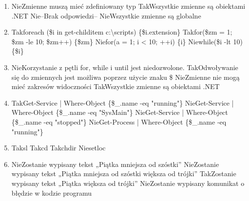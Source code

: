 \begin{enumerate}
		\newpage
		\item {}%
		{Nie}{Zmienne muszą mieć zdefiniowany typ}%
		{Tak}{Wszystkie zmienne są obiektami .NET}%
		{Nie}{--Brak odpowiedzi--}%
		{Nie}{Wszystkie zmienne są globalne}
		\item {}%
		{Tak}{foreach (\$i in get-childitem c:\textbackslash scripts) \{\$i.extension\}}%
		{Tak}{for(\$zm = 1; \$zm -le 10; \$zm++) \{\$zm\}}%
		{Nie}{for(a = 1; i < 10; ++i) \{i\}}%
		{Nie}{while(\$i -lt 10) \{\$i\}}
		\item {}%
		{Nie}{Korzystanie z pętli for, while i until jest niedozwolone.}%
		{Tak}{Odwoływanie się do zmiennych jest możliwa poprzez użycie znaku \$}%
		{Nie}{Zmienne nie mogą mieć zakresów widoczności}%
		{Tak}{Wszystkie zmienne są obiektami .NET}
		\item {}%
		{Tak}{Get-Service | Where-Object \{\$\_.name -eq "running"\}}%
		{Nie}{Get-Service | Where-Object \{\$\_.name -eq "SysMain"\}}%
		{Nie}{Get-Service | Where-Object \{\$\_.name -eq "stopped"\}}%
		{Nie}{Get-Process | Where-Object \{\$\_.name -eq "running"\}}
		\item {}%
		{Tak}{sl}%
		{Tak}{cd}%
		{Tak}{chdir}%
		{Nie}{setloc}
		\item {}%
		{Nie}{Zostanie wypisany tekst „Piątka mniejsza od szóstki”}%
		{Nie}{Zostanie wypisany tekst „Piątka mniejsza od szóstki większa od trójki”}%
		{Tak}{Zostanie wypisany tekst „Piątka większa od trójki”}%
		{Nie}{Zostanie wypisany komunikat o błędzie w kodzie programu}
		

\end{enumerate}

